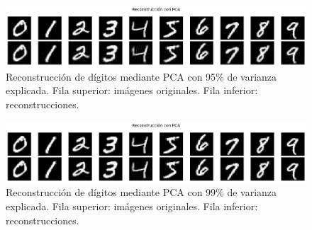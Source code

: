 \documentclass[11pt]{article}
\begin{document}
\begin{figure}[H]
    \centering
    \includegraphics[width=\textwidth]{figures/pca_reconstructions_95.png}
    \caption{Reconstrucción de dígitos mediante PCA con 95\% de varianza explicada. Fila superior: imágenes originales. Fila inferior: reconstrucciones.}
    \label{fig:appendix_pca_reconstructions_95}
\end{figure}

\begin{figure}[H]
    \centering
    \includegraphics[width=\textwidth]{figures/pca_reconstructions_99.png}
    \caption{Reconstrucción de dígitos mediante PCA con 99\% de varianza explicada. Fila superior: imágenes originales. Fila inferior: reconstrucciones.}
    \label{fig:appendix_pca_reconstructions_99}
\end{figure}
\end{document}
